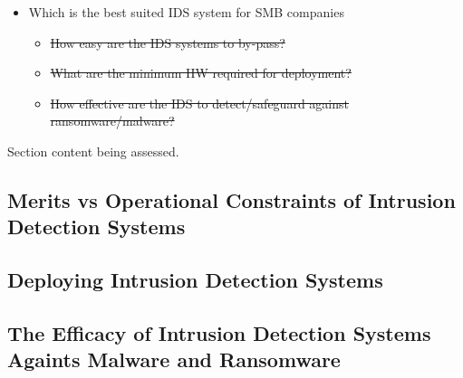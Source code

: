\begin{notes}

    \begin{itemize}
        \item Which is the best suited IDS system for SMB companies
        \begin{itemize}
            \item \sout{How easy are the IDS systems to by-pass?}
            \item \sout{What are the minimum HW required for deployment?}
            \item \sout{How effective are the IDS to detect/safeguard against ransomware/malware?}
        \end{itemize}

    \end{itemize}

    Section content being assessed.
    
\end{notes}


\subsection{Merits vs Operational Constraints of Intrusion Detection Systems}


\subsection{Deploying Intrusion Detection Systems}


\subsection{The Efficacy of Intrusion Detection Systems Againts Malware and Ransomware}

